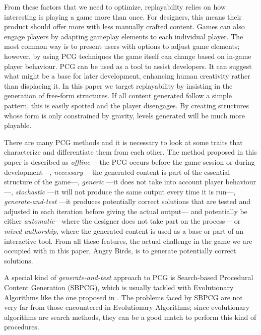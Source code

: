 \documentclass[runningheads,a4paper]{llncs}
\begin{document}
From these factors that we need to optimize, replayability relies on how interesting is 
playing a game more than once. For designers, this means their 
product should offer more with less manually crafted content. 
Games can also engage players by adapting gameplay elements to each individual 
player. The most common way is 
to present users with options to adjust game elements; however, by using PCG techniques 
the game itself can change based on in-game player behaviour.
PCG can be used as a tool to assist developers. It can suggest what might be a 
base for later development, enhancing human creativity rather than displacing 
it. In this paper we target replayability by insisting in the
generation of free-form structures. If all content generated follow a
simple pattern, this is easily spotted and the player disengages. By
creating structures whose form is only constrained by gravity, levels
generated will be much more playable.

There are many PCG methods and it is necessary to look at some traits that 
characterize and differentiate them from each 
other\cite{togelius2016introduction}. The method proposed in this paper is 
described as \textit{offline} ---the PCG occurs before the game session or 
during development---, \textit{necessary} ---the generated content is part of 
the essential structure of the game---, \textit{generic} ---it does not take 
into account player behaviour---, \textit{stochastic} ---it will not produce 
the same output every time it is run---, \textit{generate-and-test} ---it 
produces potentially correct solutions that are tested and adjusted in each 
iteration before giving the actual output--- and potentially be either 
\textit{automatic}---where the designer does not take part on the process--- or 
\textit{mixed authorship}, where the generated content is used as a base or 
part of an interactive tool. From all these features, the actual
challenge in the game we are occupied with in this paper, Angry Birds,
is to generate potentially correct solutions.

A special kind of \textit{generate-and-test} approach to PCG is
Search-based Procedural Content Generation (SBPCG), which is
usually tackled with Evolutionary Algorithms\cite{togelius2010search} like the 
one proposed in \cite{hastings2009evolving}. 
The problems faced by SBPCG are not very far from those encountered in
Evolutionary Algorithms; since evolutionary algorithms are search
methods, they can be a good match to perform this kind of procedures. 
\end{document}
